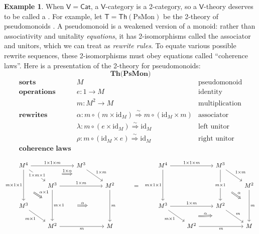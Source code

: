 \documentclass{amsart}
\newcommand{\define}[1]{{\bf \boldmath{#1}}}
\theoremstyle{definition}
\newtheorem{example}[theorem]{Example}
\newcommand{\Th}{\mathsf{Th}}
\newcommand{\Cat}{\mathsf{Cat}}
\newcommand{\V}{\mathsf{V}}
\newcommand{\T}{\mathsf{T}}
\newcommand{\maps}{\colon}
\newcommand{\id}{\mathrm{id}}
\begin{document}
\begin{example}
When $\V = \Cat$, a $\V$-category is a 2-category, so a $\V$-theory deserves to be called a \define{2-theory}.  For example, let $\T = \Th(\mathrm{PsMon})$ be the 2-theory of pseudomonoids \cite{pseudo}.   A pseudomonoid is a weakened version of a monoid: rather than associativity and unitality \textit{equations}, it has 2-isomorphisms called the associator and unitors, which we can treat as \textit{rewrite rules}.  To equate various possible rewrite sequences, these 2-isomorphisms must obey equations called ``coherence laws''.  Here is a presentation of the 2-theory for pseudomonoids:
	\[ \textbf{Th(PsMon)} \]
	\[\begin{array}{lll}
	\textbf{sorts} & M & \text{pseudomonoid}\\
	\textbf{operations} & e\maps1 \to M & \text{identity}\\
	& m\maps M^2 \to M & \text{multiplication}\\
	\textbf{rewrites} & \alpha \colon m \circ (m \times \id_M) \stackrel{\sim}{\Longrightarrow} m \circ (\id_M \times m) & \text{associator}\\
	& \lambda\maps  m \circ (e \times \id_M) \stackrel{\sim}{\Longrightarrow} \id_M & \text{left unitor}\\
	& \rho\maps m \circ (\id_M \times e) \stackrel{\sim}{\Longrightarrow} \id_M & \text{right unitor}\\
	\textbf{coherence laws}
          \end{array}\]

        \[\begin{tikzcd}
          M^4 \ar[rr,"1\times 1\times m"] \ar[dr,"1\times m\times 1" description, ""name=a1] \ar[dd, "m\times 1\times 1",swap,""name=b1] && M^3 \ar[dr, "1\times m",""name=a2] \arrow[Rightarrow,"1\times \alpha",from=a1,to=a2,shorten >=1.3cm,shorten <=1.3cm] &&& M^4 \ar[rr, "1\times 1\times m"] \ar[dd,"m\times 1\times 1",swap,""name=d1] && M^3 \ar[dd,"m\times 1" description,""name=d2] \ar[dr,"1\times m"] %
          & \\
          & M^3 \ar[rr,"1\times m"] \ar[dd,"m\times 1",""name=b2] \arrow[Rightarrow,"\alpha\times 1",from=b1,to=b2,shorten >=0.7cm,shorten <=0.7cm] && M^2 \ar[dd,"m",""name=c1] & = & &&& M^2 \ar[dd,"m",""name=f1] \arrow[Rightarrow,"\alpha",from=d2,to=f1,shorten >=0.6cm,shorten <=0.6cm] \arrow[Rightarrow,"\alpha",from=b2,to=c1,shorten >=1.3cm,shorten <=1.3cm] \\
          M^3 \ar[dr,"m\times 1",swap] &&& && M^3 \ar[rr,"1\times m"] \ar[dr,"m\times 1",swap,,""name=e1] && M^2 \ar[dr,"m",,""name=e2] \arrow[Rightarrow,"\alpha",from=e1,to=e2,shorten >=1.3cm,shorten <=1.3cm] & \\
          & M^2 \ar[rr,"m",swap] && M && & M^2 \ar[rr,"m",swap] && M
        \end{tikzcd}\]


\end{example}
\end{document}
